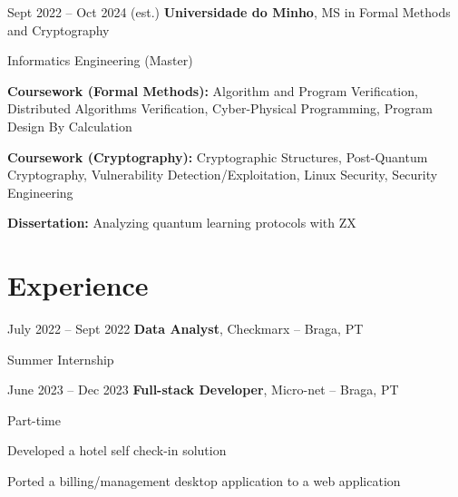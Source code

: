\documentclass[10pt, letterpaper]{article}
\begin{document}
        \begin{twocolentry}{
            Sept 2022 – Oct 2024 (est.)
        }
            \textbf{Universidade do Minho}, MS in Formal Methods and Cryptography\end{twocolentry}
        Informatics Engineering (Master)
        \vspace{0.10 cm}
        \begin{onecolentry}
            \begin{highlights}
                \item \textbf{Coursework (Formal Methods):} Algorithm and Program Verification, Distributed Algorithms Verification, Cyber-Physical Programming, Program Design By Calculation
                \item \textbf{Coursework (Cryptography):} Cryptographic Structures, Post-Quantum Cryptography, Vulnerability Detection/Exploitation, Linux Security, Security Engineering
                \item \textbf{Dissertation:} Analyzing quantum learning protocols with ZX
                
                
            \end{highlights}
        \end{onecolentry}



    
    \section{Experience}



        
        \begin{twocolentry}{
            July 2022 – Sept 2022
        }
            \textbf{Data Analyst}, Checkmarx -- Braga, PT\end{twocolentry}
        Summer Internship
        \vspace{0.10 cm}
        


        \vspace{0.2 cm}

        \begin{twocolentry}{
            June 2023 – Dec 2023
        }
            \textbf{Full-stack Developer}, Micro-net -- Braga, PT\end{twocolentry}
        Part-time
        \vspace{0.10 cm}
        \begin{onecolentry}
            \begin{highlights}
                \item Developed a hotel self check-in solution
                \item Ported a billing/management desktop application to a web application 
            \end{highlights}
        \end{onecolentry}
\end{document}
